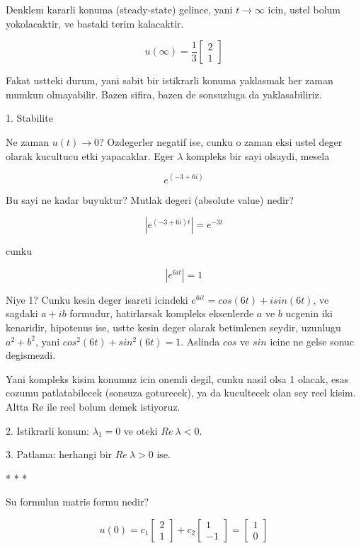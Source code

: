 \documentclass[12pt,fleqn]{article}\usepackage{../common}
\begin{document}
Denklem kararli konuma (steady-state) gelince, yani $t \rightarrow \infty$ icin,
ustel bolum yokolacaktir, ve bastaki terim kalacaktir. 

\[ u(\infty) =
\frac{1}{3}
\left[\begin{array}{c}
2 \\ 1
\end{array}\right]
 \]

Fakat ustteki durum, yani sabit bir istikrarli konuma yaklasmak her zaman
mumkun olmayabilir. Bazen sifira, bazen de sonsuzluga da yaklasabiliriz. 

1. Stabilite 

Ne zaman $u(t) \rightarrow 0$? Ozdegerler negatif ise, cunku o zaman eksi
ustel deger olarak kucultucu etki yapacaklar. Eger $\lambda$ kompleks bir
sayi olsaydi, mesela 

\[ e^{(-3 + 6i)} \]

Bu sayi ne kadar buyuktur? Mutlak degeri (absolute value) nedir? 

\[ | e^{(-3 + 6i)t}| = e^{-3t} \]

cunku 

\[ |e^{6it}| = 1 \]

Niye 1? Cunku kesin deger isareti icindeki $e^{6it} = cos(6t)+isin(6t)$, ve
sagdaki $a+ib$ formudur, hatirlarsak kompleks eksenlerde $a$ ve $b$ ucgenin
iki kenaridir, hipotenus ise, ustte kesin deger olarak betimlenen seydir,
uzunlugu $a^2 + b^2$, yani $cos^2(6t) + sin^2(6t) = 1$. Aslinda $cos$ ve
$sin$ icine ne gelse sonuc degismezdi. 

Yani kompleks kisim konumuz icin onemli degil, cunku nasil olsa 1 olacak,
esas cozumu patlatabilecek (sonsuza goturecek), ya da kucultecek olan sey
reel kisim. Altta Re ile reel bolum demek istiyoruz.

2. Istikrarli konum: $\lambda_1 = 0$ ve oteki $Re \ \lambda < 0$. 

3. Patlama: herhangi bir $Re \ \lambda > 0$ ise. 

* * * 

Su formulun matris formu nedir?

\[ u(0) =
c_1 
\left[\begin{array}{c}
2 \\ 1
\end{array}\right]
+
c_2 
\left[\begin{array}{c}
1 \\ -1
\end{array}\right] 
=
\left[\begin{array}{c}
1 \\ 0
\end{array}\right] 
\]
\end{document}
